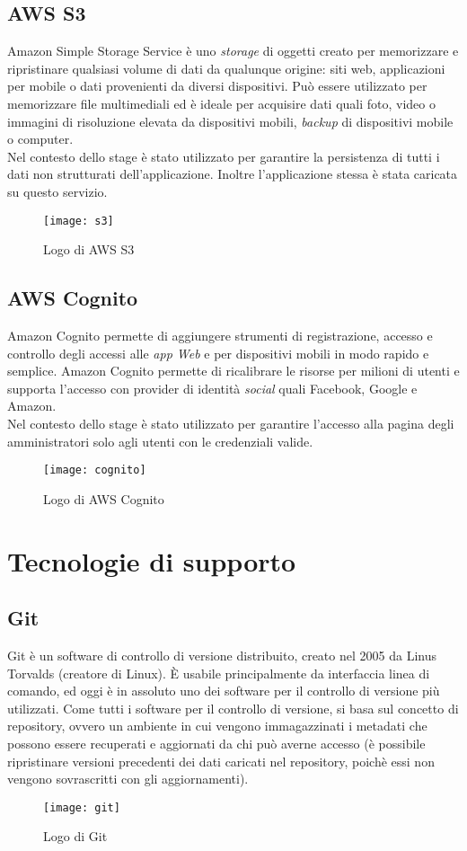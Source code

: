 \subsection{AWS S3} 
Amazon Simple Storage Service è uno \emph{storage} di
oggetti creato per memorizzare e ripristinare qualsiasi volume di dati da qualunque
origine: siti web, applicazioni per mobile o dati provenienti da diversi dispositivi. Può
essere utilizzato per memorizzare file multimediali ed è ideale per acquisire dati quali
foto, video o immagini di risoluzione elevata da dispositivi mobili, \emph{backup} di dispositivi
mobile o computer.
\\

Nel contesto dello stage è stato utilizzato per garantire la persistenza di tutti i dati
non strutturati dell’applicazione. Inoltre l'applicazione stessa è stata caricata su questo servizio.   
\begin{figure}[!h] 
	\centering 
	\texttt{[image: s3]}
	\caption{Logo di AWS S3}
\end{figure}

\subsection{AWS Cognito} 
Amazon Cognito permette di aggiungere strumenti di registrazione, accesso e controllo degli accessi alle \emph{app Web} e per dispositivi mobili in modo rapido e semplice. Amazon Cognito permette di ricalibrare le risorse per milioni di utenti e supporta l'accesso con provider di identità \emph{social} quali Facebook, Google e Amazon. 
\\

Nel contesto dello stage è stato utilizzato per garantire l'accesso alla pagina degli amministratori solo agli utenti con le credenziali valide.   
\begin{figure}[!h] 
	\centering 
	\texttt{[image: cognito]}
	\caption{Logo di AWS Cognito}
\end{figure}\newpage
\section{Tecnologie di supporto}
\subsection{Git}
Git è un software di controllo di versione distribuito, creato nel 2005 da Linus
Torvalds (creatore di Linux). È usabile principalmente da interfaccia linea di comando,
ed oggi è in assoluto uno dei software per il controllo di versione più utilizzati. Come
tutti i software per il controllo di versione, si basa sul concetto di \gls{repository}, ovvero
un ambiente in cui vengono immagazzinati i metadati che possono essere recuperati e
aggiornati da chi può averne accesso (è possibile ripristinare versioni precedenti dei
dati caricati nel repository, poichè essi non vengono sovrascritti con gli aggiornamenti).
\begin{figure}[!h] 
	\centering 
	\texttt{[image: git]}
	\caption{Logo di Git}
\end{figure}

